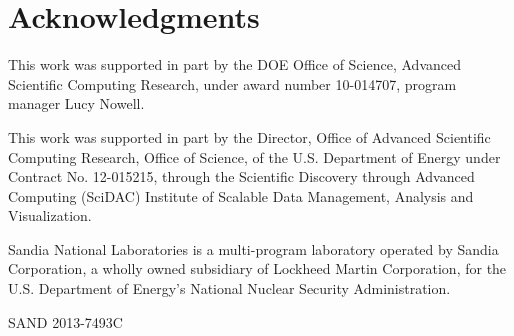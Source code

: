 \documentclass{sig-alternate}
\begin{document}
\section{Acknowledgments}

\noindent
This work was supported in part by the DOE Office of Science, Advanced
Scientific Computing Research, under award number 10-014707, program
manager Lucy Nowell.

This work was supported in part by the Director, Office of Advanced
Scientific Computing Research, Office of Science, of the U.S. Department of
Energy under Contract No. 12-015215, through the Scientific Discovery
through Advanced Computing (SciDAC) Institute of Scalable Data Management,
Analysis and Visualization.

Sandia National Laboratories is a multi-program laboratory operated by
Sandia Corporation, a wholly owned subsidiary of Lockheed Martin
Corporation, for the U.S. Department of Energy's National Nuclear Security
Administration.

\noindent
{\small SAND 2013-7493C}




\end{document}

